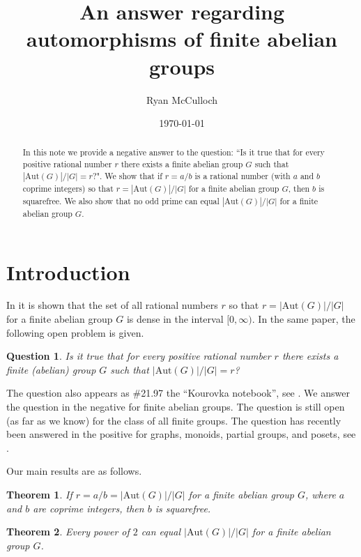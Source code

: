 \documentclass[12pt]{amsart}
\title [An answer regarding automorphisms of finite abelian groups]{An answer regarding automorphisms of finite abelian groups}
\author[McCulloch]{Ryan McCulloch}
\date{\today}
\newtheorem{thm}{Theorem}
\newtheorem{que}{Question}
\begin{document}
	
\begin{abstract}
In this note we provide a negative answer to the question: ``Is it true that for every positive rational number $r$ there exists a finite abelian group $G$ such that $|\mathrm{Aut}(G)|/|G| = r$?".  We show that if $r = a/b$ is a rational number (with $a$ and $b$ coprime integers) so that $r = |\mathrm{Aut}(G)|/|G|$ for a finite abelian group $G$, then $b$ is squarefree.  We also show that no odd prime can equal $ |\mathrm{Aut}(G)|/|G|$ for a finite abelian group $G$.
\end{abstract}


\maketitle

\section{Introduction}

In \cite{numaut} it is shown that the set of all rational numbers $r$ so that $r = |\mathrm{Aut}(G)|/|G|$ for a finite abelian group $G$ is dense in the interval $[0, \infty)$.  In the same paper, the following open problem is given.

\begin{que}
Is it true that for every positive rational number $r$ there exists a finite (abelian) group $G$ such that $|\mathrm{Aut}(G)|/|G| = r$?
\end{que}

The question also appears as \#21.97 the ``Kourovka notebook'', see \cite{notebook}.  We answer the question in the negative for finite abelian groups.  The question is still open (as far as we know) for the class of all finite groups.  The question has recently been answered in the positive for graphs, monoids, partial groups,
and posets, see \cite{monoid}.

Our main results are as follows.

\begin{thm}\label{Intro thm 1}
If $r = a/b = |\mathrm{Aut}(G)|/|G|$ for a finite abelian group $G$, where $a$ and $b$ are coprime integers, then $b$ is squarefree.
\end{thm}

\begin{thm}\label{Intro thm 2}
Every power of $2$ can equal $ |\mathrm{Aut}(G)|/|G|$ for a finite abelian group $G$.
\end{thm}
\end{document}
